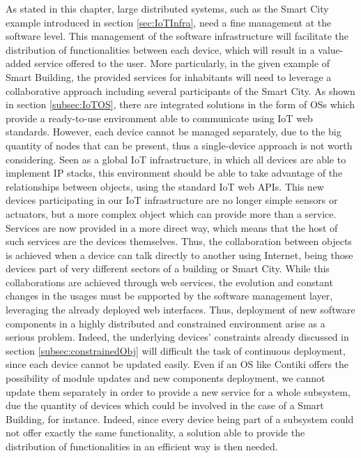 As stated in this chapter, large distributed systems, such as the Smart City example introduced in section \ref{sec:IoTInfra}, need a fine management at the software level.
This management of the software infrastructure will facilitate the distribution of functionalities between each device, which will result in a value-added service offered to the user.
More particularly, in the given example of Smart Building, the provided services for inhabitants will need to leverage a collaborative approach including several participants of the Smart City.
As shown in section \ref{subsec:IoTOS}, there are integrated solutions in the form of OSs which provide a ready-to-use environment able to communicate using IoT web standards.
However, each device cannot be managed separately, due to the big quantity of nodes that can be present, thus a single-device approach is not worth considering.
Seen as a global IoT infrastructure, in which all devices are able to implement IP stacks, this environment should be able to take advantage of the relationships between objects, using the standard IoT web APIs.
This new devices participating in our IoT infrastructure are no longer simple sensors or actuators, but a more complex object which can provide more than a service.
Services are now provided in a more direct way, which means that the host of such services are the devices themselves.
Thus, the collaboration between objects is achieved when a device can talk directly to another using Internet, being those devices part of very different sectors of a building or Smart City.
While this collaborations are achieved through web services, the evolution and constant changes in the usages must be supported by the software management layer, leveraging the already deployed web interfaces.
Thus, deployment of new software components in a highly distributed and constrained environment arise as a serious problem.
Indeed, the underlying devices' constraints already discussed in section \ref{subsec:constrainedObj} will difficult the task of continuous deployment, since each device cannot be updated easily.
Even if an OS like Contiki offers the possibility of module updates and new components deployment, we cannot update them separately in order to provide a new service for a whole subsystem, due the quantity of devices which could be involved in the case of a Smart Building, for instance.
Indeed, since every device being part of a subsystem could not offer exactly the same functionality, a solution able to provide the distribution of functionalities in an efficient way is then needed.

